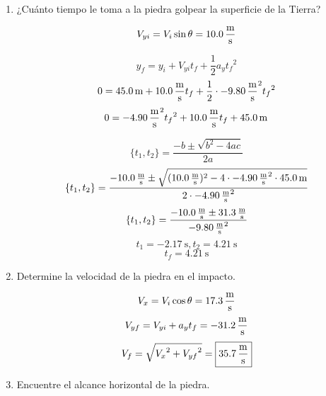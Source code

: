 \documentclass[Análisis.root.tex]{subfiles}
\begin{document}
\begin{enumerate}
        \begin{center}
        \end{center}

        \begin{enumerate}
          \item ¿Cuánto tiempo le toma a la piedra golpear la superficie de la Tierra?

                \[V_{yi}=V_i\sin{\theta}=\SI{10,0}{\meter\over\second}\]

                \[y_f=y_i+V_{yi}t_f+\frac{1}{2}a_y{t_f}^2\]
                \[0=\SI{45,0}{\meter}+\SI{10,0}{\meter\over\second}t_f+\frac{1}{2}\cdot\SI{-9,80}{\meter\over\second\squared}{t_f}^2\]
                \[0=\SI{-4,90}{\meter\over\second\squared}{t_f}^2+\SI{10,0}{\meter\over\second}t_f+\SI{45,0}{\meter}\]

                \[\{t_1,t_2\}=\frac{-b\pm\sqrt{b^2-4ac}}{2a}\]
                \[\{t_1,t_2\}=\frac{\SI{-10,0}{\meter\over\second}\pm\sqrt{(\SI{10,0}{\meter\over\second})^2-4\cdot\SI{-4,90}{\meter\over\second\squared}\cdot\SI{45,0}{\meter}}}{2\cdot\SI{-4,90}{\meter\over\second\squared}}\]
                \[\{t_1,t_2\}=\frac{\SI{-10,0}{\meter\over\second}\pm\SI{31,3}{\meter\over\second}}{\SI{-9,80}{\meter\over\second\squared}}\]
                \[t_1=\SI{-2,17}{\second}, t_2=\SI{4,21}{\second}\]
                \[t_f=\boxed{\SI{4,21}{\second}}\]

          \item Determine la velocidad de la piedra en el impacto.

                \[V_x=V_i\cos{\theta}=\SI{17,3}{\meter\over\second}\]
                \[V_{yf}=V_{yi}+a_yt_f=\SI{-31,2}{\meter\over\second}\]
                \[V_f=\sqrt{{V_x}^2+{V_{yf}}^2}=\boxed{\SI{35,7}{\meter\over\second}}\]

          \item Encuentre el alcance horizontal de la piedra.


\end{enumerate}
\end{enumerate}
\end{document}
